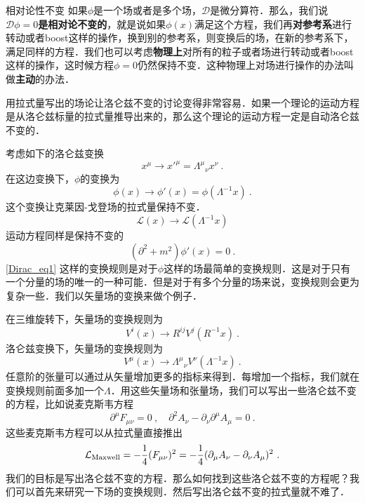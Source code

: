 
\begin{definition}{相对论性不变}
如果$\phi$是一个场或者是多个场，$\mathcal D$是微分算符．那么，我们说\textbf{$\mathcal D \phi = 0$是相对论不变的}，就是说如果$\phi(x)$满足这个方程，我们再\textbf{对参考系}进行转动或者boost这样的操作，换到别的参考系，则变换后的场，在新的参考系下，满足同样的方程．我们也可以考虑\textbf{物理上}对所有的粒子或者场进行转动或者boost这样的操作，这时候方程$\mathcal\phi = 0$仍然保持不变．这种物理上对场进行操作的办法叫做\textbf{主动}的办法．
\end{definition}
用拉式量写出的场论让洛仑兹不变的讨论变得非常容易．如果一个理论的运动方程是从洛仑兹标量的拉式量推导出来的，那么这个理论的运动方程一定是自动洛仑兹不变的．

考虑如下的洛仑兹变换
\begin{equation}
x^\mu \rightarrow x'^\mu = \Lambda^\mu{}_\nu x^\nu ~. 
\end{equation}
在这边变换下，$\phi$的变换为
\begin{equation}\label{Dirac_eq1}
\phi(x)\rightarrow \phi'(x)=\phi(\Lambda^{-1}x)~.
\end{equation}
这个变换让克莱因-戈登场的拉式量保持不变．
\begin{equation}
\mathcal L(x)\rightarrow \mathcal L(\Lambda^{-1}x)
\end{equation}
运动方程同样是保持不变的
\begin{equation}
(\partial^2+m^2)\phi'(x) = 0 ~.
\end{equation}
\autoref{Dirac_eq1} 这样的变换规则是对于$\phi$这样的场最简单的变换规则．这是对于只有一个分量的场的唯一的一种可能．但是对于有多个分量的场来说，变换规则会更为复杂一些．我们以矢量场的变换来做个例子．

在三维旋转下，矢量场的变换规则为
\begin{equation}
V^i(x) \rightarrow R^{ij} V^j (R^{-1}x)~.
\end{equation}
洛仑兹变换下，矢量场的变换规则为
\begin{equation}
V^\mu(x) \rightarrow \Lambda^\mu{}_{\nu}V^\nu(\Lambda^{-1}x)~.
\end{equation}
任意阶的张量可以通过从矢量增加更多的指标来得到．每增加一个指标，我们就在变换规则前面多加一个$\Lambda$．用这些矢量场和张量场，我们可以写出一些洛仑兹不变的方程，比如说麦克斯韦方程
\begin{equation}
\partial^\mu F_{\mu\nu} = 0~,\quad \partial^2 A_\nu -\partial_\nu \partial^\mu A_\mu = 0~.  
\end{equation}
这些麦克斯韦方程可以从拉式量直接推出
\begin{equation}
\mathcal L_{\rm Maxwell} = - \frac{1}{4} (F_{\mu\nu})^2 = - \frac{1}{4} (\partial_\mu A_\nu - \partial_\nu A_\mu)^2~. 
\end{equation}
我们的目标是写出洛仑兹不变的方程．那么如何找到这些洛仑兹不变的方程呢？我们可以首先来研究一下场的变换规则．然后写出洛仑兹不变的拉式量就不难了．

